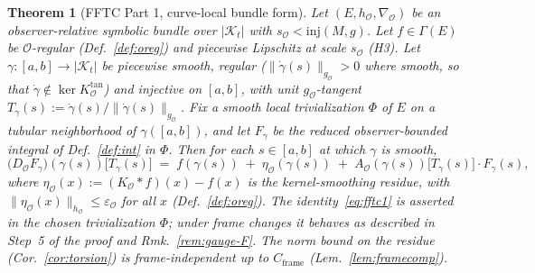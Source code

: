 \documentclass[11pt]{article}
\newtheorem{theorem}{Theorem}
\newcommand{\Kt}{\mathcal{K}_t}
\newcommand{\sO}{s_{\mathcal{O}}}  %
\newcommand{\Obs}{\mathcal{O}}
\newcommand{\Eps}{\varepsilon_{\Obs}}
\newcommand{\nablaO}{\nabla_{\Obs}}
\newcommand{\AO}{A_{\Obs}}
\newcommand{\gO}{g_{\Obs}}
\newcommand{\hO}{h_{\Obs}}
\newcommand{\KO}{K_{\Obs}}
\newcommand{\DO}{D_{\Obs}}
\newcommand{\EE}{E}
\newcommand{\Sect}{\Gamma}
\newcommand{\Cframe}{C_{\mathrm{frame}}}
\begin{document}
\begin{theorem}[FFTC Part 1, curve-local bundle form]
\label{thm:fftc1}
Let $(\EE, \hO, \nablaO)$ be an observer-relative symbolic bundle
over $|\Kt|$ with $\sO < \mathrm{inj}(M, g)$. Let $f \in \Sect(\EE)$
be $\Obs$-regular (Def.~\ref{def:oreg}) and piecewise Lipschitz at
scale $\sO$ (H3). Let $\gamma: [a, b] \to |\Kt|$ be piecewise
smooth, regular ($\|\dot\gamma(s)\|_{\gO} > 0$ where smooth, so that
$\dot\gamma \notin \ker \KO^{\mathrm{tan}}$) and injective on
$[a, b]$, with unit $\gO$-tangent
$T_\gamma(s) := \dot\gamma(s) / \|\dot\gamma(s)\|_{\gO}$. Fix a smooth
local trivialization $\Phi$ of $\EE$ on a tubular neighborhood of
$\gamma([a, b])$, and let $F_\gamma$ be the reduced
observer-bounded integral of Def.~\ref{def:int} in $\Phi$. Then for
each $s \in [a, b]$ at which $\gamma$ is smooth,
\begin{equation}
\big(\DO F_\gamma\big)\!(\gamma(s))\big[T_\gamma(s)\big]
\;=\; f(\gamma(s)) \;+\; \eta_{\Obs}(\gamma(s)) \;+\; \AO(\gamma(s))\big[T_\gamma(s)\big]\cdot F_\gamma(s),
\label{eq:fftc1}
\end{equation}
where $\eta_\Obs(x) := (\KO * f)(x) - f(x)$ is the kernel-smoothing
residue, with $\|\eta_\Obs(x)\|_{\hO} \leq \Eps$ for all $x$
(Def.~\ref{def:oreg}). The identity~\eqref{eq:fftc1} is asserted in
the chosen trivialization $\Phi$; under frame changes it behaves as
described in Step~5 of the proof and
Rmk.~\ref{rem:gauge-F}. The norm bound on the residue
(Cor.~\ref{cor:torsion}) is frame-independent up to $\Cframe$
(Lem.~\ref{lem:framecomp}).
\end{theorem}
\end{document}
